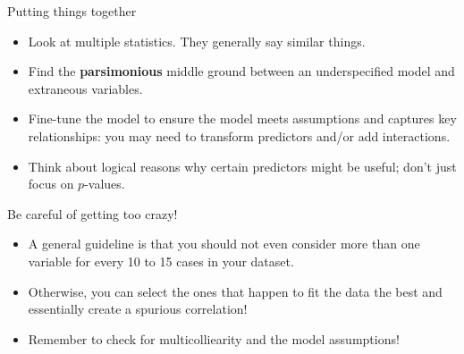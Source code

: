 \documentclass{beamer}\usepackage[]{graphicx}\usepackage[]{color}
\newenvironment{knitrout}{}{} %
\begin{document}
\begin{darkframes}
\begin{frame}[fragile]
      \vspace{-1in}

\begin{knitrout}


\end{knitrout}
    \end{frame}

    \begin{frame}{Putting things together}
      \begin{itemize}[<+->]
        \item Look at multiple statistics. They generally say similar things.
        \item Find the \textbf{parsimonious} middle ground between an underspecified model and extraneous variables.
        \item Fine-tune the model to ensure the model meets assumptions and captures key relationships: you may need to transform predictors and/or add interactions.
        \item Think about logical reasons why certain predictors might be useful; don't just focus on $p$-values.
      \end{itemize}
    \end{frame}


    \begin{frame}{Be careful of getting too crazy!}
      \begin{itemize}[<+->]
        \item A general guideline is that you should not even consider more than one variable for every 10 to 15 cases in your dataset.
        \item Otherwise, you can select the ones that happen to fit the data the best and essentially create a spurious correlation!
        \item Remember to check for multicolliearity and the model assumptions!
      \end{itemize}
    \end{frame}
  \end{darkframes}
\end{document}
